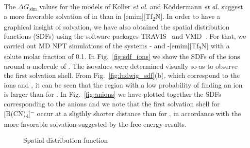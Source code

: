 \documentclass[3p,twocolumn]{elsarticle}
\begin{document}
The $\Delta G_{\, \text{sim}}$ values for the models of Koller \textit{et al.} \cite{Koller_2012} and K\"{o}ddermann \textit{et al.} \cite{K_ddermann_2007} suggest a more favorable solvation of  in \ce{[emim][B(CN)_4]} than in [emim][Tf\textsubscript{2}N]. In order to have a graphical insight of solvation, we have also obtained the spatial distribution functions (SDFs) \cite{Svishchev_1993} using the software packages TRAVIS~\cite{Brehm_2011} and VMD~\cite{HUMP96}. For that, we carried out MD NPT simulations of the systems -\ce{[emim][B(CN)_4]} and -[emim][Tf\textsubscript{2}N] with a solute molar fraction of 0.1. In Fig.~\ref{fig:sdf_ions} we show the SDFs of the ions around a molecule of . The isovalues were determined visually so as to observe the first solvation shell. From Fig.~\ref{fig:ludwig_sdf}(b), which correspond to the ions \ce{[emim]^+} and \ce{[NTf_2]^-}, it can be seen that the region with a low probability of finding an ion is larger than for \ce{[emim][B(CN)_4]}. In Fig.~\ref{fig:anions} we have plotted together the SDFs corresponding to the anions and we note that the first solvation shell for [B(CN)\textsubscript{4}]$^{-}$ occur at a sligthly shorter distance than for \ce{[NTf_2]^-}, in accordance with the more favorable solvation suggested by the free energy results.

\begin{figure}
\centering
{}

\caption{Spatial distribution function}
\label{fig:sdf}
\end{figure}
\end{document}
